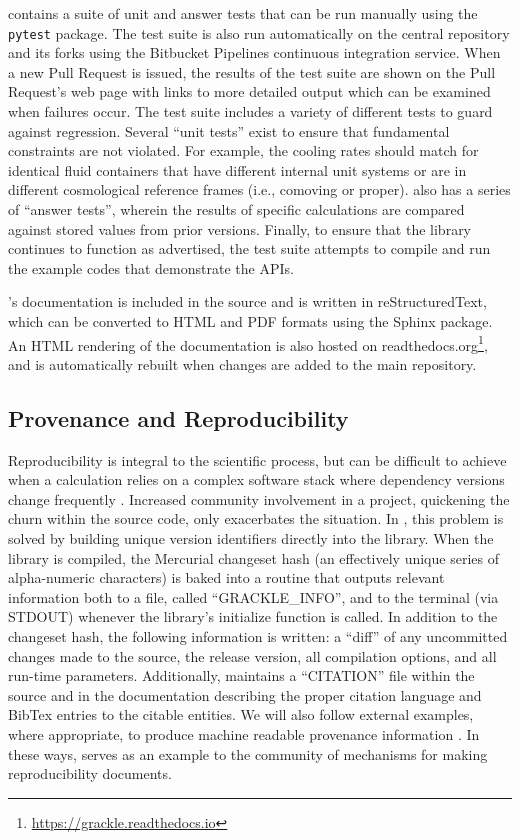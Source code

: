 \grackle{} contains a suite of unit and answer
tests that can be run manually using the \texttt{pytest} package.  The
test suite is also run automatically on the central repository and its
forks using the Bitbucket Pipelines continuous integration service.
When a new Pull Request is issued, the results of the test suite are
shown on the Pull Request's web page with links to more detailed
output which can be examined when failures occur.  The test suite
includes a variety of different tests to guard against regression.
Several ``unit tests'' exist to ensure that fundamental
constraints are not violated.  For example, the cooling rates should
match for identical fluid containers that have different internal unit
systems or are in different cosmological reference frames (i.e.,
comoving or proper).  \grackle{} also has a series of ``answer
tests'', wherein the results of specific calculations are compared
against stored values from prior versions.  Finally, to ensure that
the library continues to function as advertised, the test suite
attempts to compile and run the example codes that demonstrate the
APIs.

\grackle{}'s documentation is included in the source and is written in
reStructuredText, which can be converted to HTML and PDF formats
using the Sphinx package.  An HTML rendering of the documentation is
also hosted on
readthedocs.org\footnote{\url{https://grackle.readthedocs.io}},
and is automatically rebuilt when changes are added to the main
repository.

\subsection{Provenance and Reproducibility}

Reproducibility is integral to the scientific process, but can be
difficult to achieve when a calculation relies on a complex software
stack where dependency versions change frequently
\citep{2014arXiv1412.5557J, 2016arXiv161009958L}.  Increased
community involvement in a project, quickening the churn within the
source code, only exacerbates the situation.  In \grackle{}, this
problem is solved by building unique version identifiers directly
into the library.  When the library is compiled, the Mercurial
changeset hash (an effectively unique series of alpha-numeric
characters) is baked into a routine that outputs relevant information
both to a file, called ``GRACKLE\_INFO'', and to the terminal (via
STDOUT) whenever the library's initialize function is called.  In
addition to the changeset hash, the following information is written:
a ``diff'' of any uncommitted changes made to the source, the release
version, all compilation options, and all run-time parameters.
Additionally, \grackle{} maintains a ``CITATION'' file within the
source and in the documentation describing the proper citation
language and BibTex entries to the citable entities.  We will also
follow external examples, where appropriate, to produce machine
readable provenance information \citep[e.g.,][]{force11,
  Fenner097196}.  In these ways, \grackle{} serves as an example to
the community of mechanisms for making reproducibility documents.

